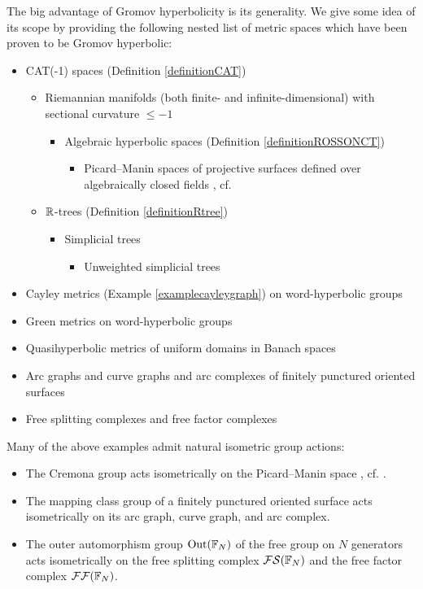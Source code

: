The big advantage of Gromov hyperbolicity is its generality. We give some idea of its scope by providing the following nested list of metric spaces which have been proven to be Gromov hyperbolic:


\begin{itemize}
\item CAT(-1) spaces (Definition \ref{definitionCAT})
\begin{itemize}
\item Riemannian manifolds (both finite- and infinite-dimensional) with sectional curvature $\leq -1$
\begin{itemize}
\item Algebraic hyperbolic spaces (Definition \ref{definitionROSSONCT})
\begin{itemize}
\item Picard--Manin spaces of projective surfaces defined over algebraically closed fields \cite{Manin}, cf. \cite[]{Cantat_Cremona}
\end{itemize}
\end{itemize}
\item $\R$-trees (Definition \ref{definitionRtree})
\begin{itemize}
\item Simplicial trees
\begin{itemize}
\item Unweighted simplicial trees
\end{itemize}
\end{itemize}
\end{itemize}
\item Cayley metrics (Example \ref{examplecayleygraph}) on word-hyperbolic groups
\item Green metrics on word-hyperbolic groups \cite[Corollary 1.2]{BHM}
\item Quasihyperbolic metrics of uniform domains in Banach spaces \cite[Theorem 2.12]{Vaisala2}
\item Arc graphs and curve graphs \cite{HPW} and arc complexes \cite{MasurSchleimer, HilionHorbez} of finitely punctured oriented surfaces
\item Free splitting complexes \cite{HandelMosher, HilionHorbez} and free factor complexes \cite{BestvinaFeighn, KapovichRafi, HilionHorbez}
\end{itemize}

\begin{remark}
Many of the above examples admit natural isometric group actions:
\begin{itemize}
\item The Cremona group acts isometrically on the Picard--Manin space \cite{Manin}, cf. \cite[Theorem 3.3]{Cantat_Cremona}.
\item The mapping class group of a finitely punctured oriented surface acts isometrically on its arc graph, curve graph, and arc complex.
\item The outer automorphism group $\Out(\F_N)$ of the free group on $N$ generators acts isometrically on the free splitting complex $\FF\SS(\F_N)$ and the free factor complex $\FF\FF(\F_N)$.
\end{itemize}
\end{remark}


